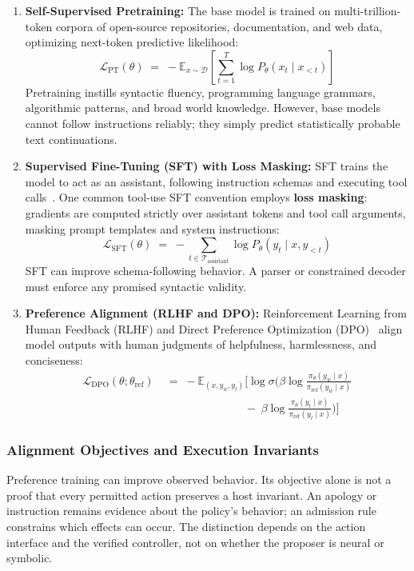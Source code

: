 \begin{enumerate}[leftmargin=1.8em,itemsep=3pt]
  \item \textbf{Self-Supervised Pretraining:} The base model is trained on multi-trillion-token corpora of open-source repositories, documentation, and web data, optimizing next-token predictive likelihood:
  \begin{equation}
  \mathcal{L}_{\mathrm{PT}}(\theta) \;=\; -\mathbb{E}_{x \sim \mathcal{D}}\left[ \sum_{t=1}^T \log P_\theta(x_t \mid x_{<t}) \right]
  \end{equation}
  Pretraining instills syntactic fluency, programming language grammars, algorithmic patterns, and broad world knowledge. However, base models cannot follow instructions reliably; they simply predict statistically probable text continuations.

  \item \textbf{Supervised Fine-Tuning (SFT) with Loss Masking:} SFT trains the model to act as an assistant, following instruction schemas and executing tool calls~. One common tool-use SFT convention employs \textbf{loss masking}: gradients are computed strictly over assistant tokens and tool call arguments, masking prompt templates and system instructions:
  \begin{equation}
  \mathcal{L}_{\mathrm{SFT}}(\theta) \;=\; -\sum_{t \in \mathcal{T}_{\mathrm{assistant}}} \log P_\theta(y_t \mid x, y_{<t})
  \end{equation}
  SFT can improve schema-following behavior. A parser or constrained decoder must enforce any promised syntactic validity.

  \item \textbf{Preference Alignment (RLHF and DPO):} Reinforcement Learning from Human Feedback (RLHF) and Direct Preference Optimization (DPO)~ align model outputs with human judgments of helpfulness, harmlessness, and conciseness:
  \begin{align}
  \mathcal{L}_{\mathrm{DPO}}(\theta; \theta_{\mathrm{ref}}) \;&=\; -\mathbb{E}_{(x, y_w, y_l)}\Big[ \log \sigma \Big( \beta \log \frac{\pi_\theta(y_w \mid x)}{\pi_{\mathrm{ref}}(y_w \mid x)} \nonumber \\
  &\qquad\qquad\qquad\quad -\; \beta \log \frac{\pi_\theta(y_l \mid x)}{\pi_{\mathrm{ref}}(y_l \mid x)} \Big) \Big]
  \end{align}
\end{enumerate}

\subsubsection{Alignment Objectives and Execution Invariants}
Preference training can improve observed behavior. Its objective alone is not a proof that every permitted action preserves a host invariant. An apology or instruction remains evidence about the policy's behavior; an admission rule constrains which effects can occur. The distinction depends on the action interface and the verified controller, not on whether the proposer is neural or symbolic.

